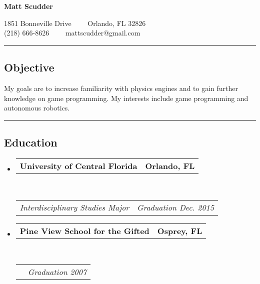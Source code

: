 \documentclass[11pt,letterpaper]{article}
\makeatletter
\newcommand{\headerrow}[2]
{\begin{tabular*}{\linewidth}{l@{\extracolsep{\fill}}r}
	#1 &
	#2 \\
\end{tabular*}}
\makeatother
\begin{document}
\begin{center}
{\LARGE \textbf{Matt Scudder}}

1851 Bonneville Drive\ \ \textbullet
\ \ Orlando, FL 32826
\\
(218) 666-8626\ \ \textbullet
\ \ mattscudder@gmail.com
\end{center}

\hrule
\subsection*{Objective}
My goals are to increase familiarity with physics engines and to gain further knowledge on game programming. My interests include game programming and autonomous robotics. \\

\hrule
\vspace{-0.4em}
\subsection*{Education}

\begin{itemize}
	\parskip=0.1em

	\item
	\headerrow
		{\textbf{University of Central Florida}}
		{\textbf{Orlando, FL}}
	\\
	\headerrow
		{\emph{Interdisciplinary Studies Major}}
		{\emph{Graduation Dec. 2015}}

		\item
	\headerrow
		{\textbf{Pine View School for the Gifted}}
		{\textbf{Osprey, FL}}
	\\
	\headerrow
		{\emph{}}
		{\emph{Graduation 2007}}



\end{itemize}
\end{document}
